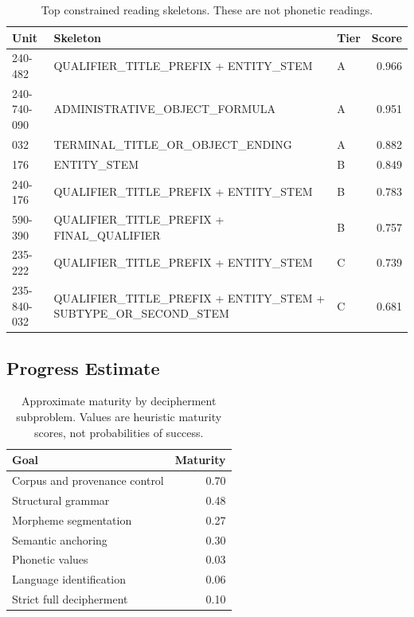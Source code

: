 \begin{table}[htbp]
\centering
\footnotesize
\begin{tabular}{lp{}lr}
\toprule
\textbf{Unit} & \textbf{Skeleton} & \textbf{Tier} & \textbf{Score} \\
\midrule
240-482 & QUALIFIER\_TITLE\_PREFIX + ENTITY\_STEM & A & 0.966 \\
240-740-090 & ADMINISTRATIVE\_OBJECT\_FORMULA & A & 0.951 \\
032 & TERMINAL\_TITLE\_OR\_OBJECT\_ENDING & A & 0.882 \\
176 & ENTITY\_STEM & B & 0.849 \\
240-176 & QUALIFIER\_TITLE\_PREFIX + ENTITY\_STEM & B & 0.783 \\
590-390 & QUALIFIER\_TITLE\_PREFIX + FINAL\_QUALIFIER & B & 0.757 \\
235-222 & QUALIFIER\_TITLE\_PREFIX + ENTITY\_STEM & C & 0.739 \\
235-840-032 & QUALIFIER\_TITLE\_PREFIX + ENTITY\_STEM + SUBTYPE\_OR\_SECOND\_STEM & C & 0.681 \\
\bottomrule
\end{tabular}
\caption{Top constrained reading skeletons. These are not phonetic readings.}
\end{table}

\subsection{Progress Estimate}

\begin{table}[htbp]
\centering
\footnotesize
\begin{tabular}{p{}r}
\toprule
\textbf{Goal} & \textbf{Maturity} \\
\midrule
Corpus and provenance control & 0.70 \\
Structural grammar & 0.48 \\
Morpheme segmentation & 0.27 \\
Semantic anchoring & 0.30 \\
Phonetic values & 0.03 \\
Language identification & 0.06 \\
Strict full decipherment & 0.10 \\
\bottomrule
\end{tabular}
\caption{Approximate maturity by decipherment subproblem. Values are heuristic maturity scores, not probabilities of success.}
\end{table}
